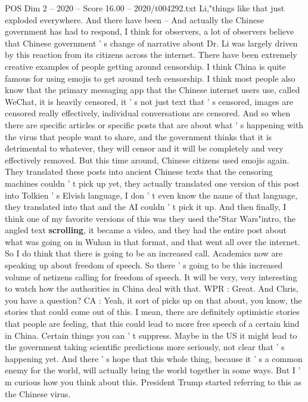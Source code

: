 \begin{textsample}{POS Dim 2 – 2020 – Score 16.00 – 2020/t004292.txt}
Li,"things like that just exploded everywhere.
And there have been -- And actually the Chinese government has had to respond, I think for observers, a lot of observers believe that Chinese government ' s change of narrative about Dr.
Li was largely driven by this reaction from its citizens across the internet.
There have been extremely creative examples of people getting around censorship.
I think China is quite famous for using emojis to get around tech censorship.
I think most people also know that the primary messaging app that the Chinese internet users use, called WeChat, it is heavily censored, it ' s not just text that ' s censored, images are censored really effectively, individual conversations are censored.
And so when there are specific articles or specific posts that are about what ' s happening with the virus that people want to share, and the government thinks that it is detrimental to whatever, they will censor and it will be completely and very effectively removed.
But this time around, Chinese citizens used emojis again.
They translated these posts into ancient Chinese texts that the censoring machines couldn ' t pick up yet, they actually translated one version of this post into Tolkien ' s Elvish language, I don ' t even know the name of that language, they translated into that and the AI couldn ' t pick it up.
And then finally, I think one of my favorite versions of this was they used the"Star Wars"intro, the angled text \textbf{scrolling}, it became a video, and they had the entire post about what was going on in Wuhan in that format, and that went all over the internet.
So I do think that there is going to be an increased call.
Academics now are speaking up about freedom of speech.
So there ' s going to be this increased volume of netizens calling for freedom of speech.
It will be very, very interesting to watch how the authorities in China deal with that.
WPR : Great.
And Chris, you have a question?
CA : Yeah, it sort of picks up on that about, you know, the stories that could come out of this.
I mean, there are definitely optimistic stories that people are feeling, that this could lead to more free speech of a certain kind in China.
Certain things you can ' t suppress.
Maybe in the US it might lead to the government taking scientific predictions more seriously, not clear that ' s happening yet.
And there ' s hope that this whole thing, because it ' s a common enemy for the world, will actually bring the world together in some ways.
But I ' m curious how you think about this.
President Trump started referring to this as the Chinese virus.

\end{textsample}
